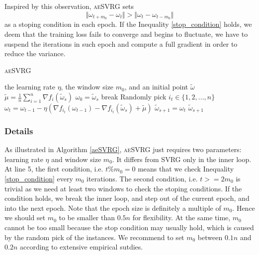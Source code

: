 \documentclass[conference]{IEEEtran}
\begin{document}
 Inspired by this observation, \textsc{aeSVRG}  sets 
 \begin{equation}
 \label{stop_condition}
 \Vert\omega_{t+m_0}-\omega_t\Vert>\Vert\omega_{t}-\omega_{t-m_0}\Vert
 \end{equation}
 as a stoping condition in each epoch. If the Inequality \ref{stop_condition} holds, we deem that the training loss fails to converge and begins to fluctuate, we have to suspend the iterations in such epoch and compute a full gradient in order to reduce the variance.
 
  \begin{algorithm}[t]
 	\caption{\textsc{aeSVRG}}
	\label{aeSVRG}
	\begin{algorithmic}[1]
	\Require the learning rate $\eta$, the window size $m_0$, and an initial point $\tilde{\omega}$
		\State $\tilde{\mu} = \frac{1}{n}\sum\limits_{i=1}^{n}\nabla f_{i}(\tilde{\omega}_{s})$
		\State $\omega_0 = \tilde{\omega}_s$
			\State break
			\EndIf
			\State Randomly pick $i_t\in\{1, 2, ..., n\}$
			\State $\omega_t = \omega_{t-1} - \eta(\nabla f_{i_t}(\omega_{t-1}) - \nabla f_{i_t}(\tilde{\omega}_s)+\tilde{\mu})$
		\EndFor		
		\State $\tilde{\omega}_{s+1} = \omega_{t}$
	\EndFor
	\State \Return $\tilde{\omega}_{s+1}$
	\end{algorithmic}
\end{algorithm}

 
\subsubsection{Details}
As illustrated in Algorithm \ref{aeSVRG}, \textsc{aeSVRG} just requires two parameters: learning rate $\eta$ and window size $m_0$. It differs from SVRG only in the inner loop. At line 5, the first condition, i.e. $t\%m_0=0$ means that  we check Inequality \ref{stop_condition} every $m_0$ iterations. The second condition, i.e. $t>=2m_0$ is trivial as we need at least two windows to check the stoping conditions.  If the condition holds, we break the inner loop, and step out of the current epoch, and into the next epoch. Note that the epoch size is definitely a multiple of $m_0$. Hence we should set $m_0$ to be smaller than $0.5n$ for flexibility. At the same time, $m_0$ cannot be too small because the stop condition may usually hold, which is caused by the random pick of the instances. We recommend to set $m_0$ between $0.1n$ and $0.2n$ according to extensive empirical sutdies.
\end{document}
